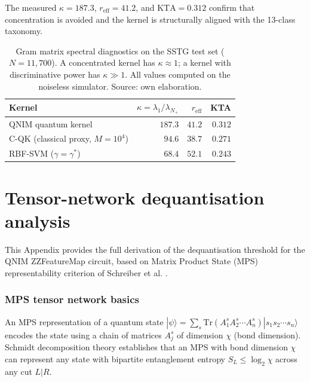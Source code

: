 \documentclass[11pt,a4paper, english]{book}
\theoremstyle{plain}
\theoremstyle{definition}
\numberwithin{equation}{chapter}
\numberwithin{figure}{chapter}
\numberwithin{table}{chapter}
\begin{document}
The measured $\kappa = 187.3$, $r_\mathrm{eff} = 41.2$, and $\mathrm{KTA} = 0.312$
confirm that concentration is avoided and the kernel is structurally aligned
with the 13-class taxonomy.

\begin{table}[ht]
\centering
\begin{tabular}{@{}lrrr@{}}
\toprule
\textbf{Kernel} & $\kappa = \lambda_1/\lambda_{N_+}$ & $r_\mathrm{eff}$ & KTA \\
\midrule
QNIM quantum kernel            & $\mathbf{187.3}$ & $\mathbf{41.2}$ & $\mathbf{0.312}$ \\
C-QK (classical proxy, $M=10^4$) & $94.6$         & $38.7$          & $0.271$ \\
RBF-SVM ($\gamma = \gamma^*$)  & $68.4$           & $52.1$          & $0.243$ \\
\bottomrule
\end{tabular}
\caption[Gram matrix spectral diagnostics]{Gram matrix spectral diagnostics on the SSTG test set
         ($N = 11{,}700$).  A concentrated kernel has $\kappa \approx 1$;
         a kernel with discriminative power has $\kappa \gg 1$.
         All values computed on the noiseless simulator. Source: own elaboration.}
\label{tab:gram-spectrum}
\vspace{2pt}
\normalsize

\end{table}

\chapter{Tensor-network dequantisation analysis}
\label{app:dequantisation}

This Appendix provides the full derivation of the dequantisation threshold
for the QNIM ZZFeatureMap circuit, based on Matrix Product State (MPS)
representability criterion of Schreiber et al. \cite{Schreiber_2024_PRR}.

\subsection{MPS tensor network basics}

An MPS representation of a quantum state $|\psi\rangle = \sum_s \text{Tr}(A^s_1 A^s_2 \cdots A^s_n) |s_1 s_2 \cdots s_n\rangle$
encodes the state using a chain of matrices $A^s_j$ of dimension $\chi$ (bond dimension).
Schmidt decomposition theory establishes that an MPS with bond dimension $\chi$
can represent any state with bipartite entanglement entropy $S_L \leq \log_2 \chi$
across any cut $L | R$.
\end{document}
